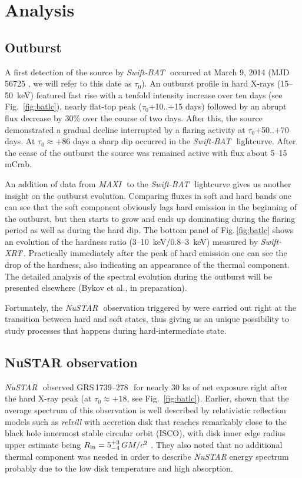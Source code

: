 \documentclass[a4paper,fleqn,usenatbib]{mnras}
\def\grs{{GRS\,1739--278\,}}
\def\swiftx{{\em Swift-XRT\,}}
\def\swiftb{{\em Swift-BAT\,}}
\def\nustar{{\em NuSTAR\,}}
\def\maxi{{\em MAXI\,}}
\begin{document}
\section{Analysis}
\subsection{Outburst}
A first detection of the source by \swiftb\, occurred at March 9, 2014 (MJD 56725 \citep{krimm14_atel}, we will refer to this date as $\tau_{0}$). 
An outburst profile in hard X-rays (15--50~keV) featured fast rise with a tenfold intensity increase over ten days (see Fig.~\ref{fig:batlc}), nearly flat-top peak ($\tau_{0}$+10..+15 days) followed by an abrupt flux decrease by 30\% over the course of two days.
After this, the source demonstrated a gradual decline interrupted by a flaring activity at $\tau_{0}$+50..+70 days. 
At $\tau_{0} \approx +86$ days a sharp dip occurred in the \swiftb\ lightcurve. 
After the cease of the outburst the source was remained active with flux about 5--15 mCrab. 

An addition of data from \maxi\, to the \swiftb\, lightcurve gives us another insight on the outburst evolution. Comparing fluxes in soft and hard bands one can see that the soft component obviously lags hard emission in the beginning of the outburst, but then starts to grow and ends up dominating during the flaring period as well as during the hard dip. 
The bottom panel of Fig.\,\ref{fig:batlc} shows an evolution of the hardness ratio (3--10~keV/0.8--3~keV) measured by \swiftx. 
Practically immediately after the peak of hard emission one can see the drop of the hardness, also indicating an appearance of the thermal component.
The detailed analysis of the spectral evolution during the outburst will be presented elsewhere (Bykov et al., in preparation).

Fortunately, the \nustar\ observation triggered by \cite{miller15_nust} were carried out right at the transition between hard and soft states, thus giving us an unique possibility to study processes that happens during hard-intermediate state. 


\subsection{NuSTAR observation}
\label{sec:nust} 

\nustar\, observed \grs\ for nearly 30 ks of net exposure right after the hard X-ray peak (at $\tau_{0}\approx+18$, see Fig.~\ref{fig:batlc}). 
Earlier, \cite{miller15_nust} shown that the average spectrum of this observation is well described by relativistic reflection models such as {\it relxill} \citep{garcia14, dauser14,dauser16} with accretion disk that reaches remarkably close to the black hole innermost stable circular orbit (ISCO), with disk inner edge radius upper estimate being $R_{\rm in} = 5^{+3}_{-4}\, G M/c^{2}$ \citep{miller15_nust}. 
They also noted that no additional thermal component was needed in order to describe {\it NuSTAR} energy spectrum probably due to the low disk temperature and high absorption.
\end{document}
